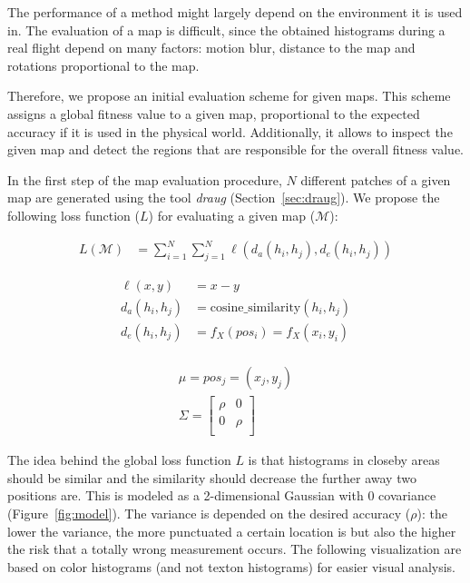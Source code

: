 The performance of a method might largely depend
on the environment it is used in. The evaluation of a map is
difficult, since the obtained histograms during a real flight depend
on many factors: motion blur, distance to the map and rotations
proportional to the map.

Therefore, we propose an initial evaluation scheme for given
maps. This scheme assigns a global fitness value to a given map,
proportional to the expected accuracy if it is used in the physical
world. Additionally, it allows to inspect the given map and detect the
regions that are responsible for the overall fitness value.

In the first step of the map evaluation procedure, $N$ different
patches of a given map are generated using the tool \emph{draug}
(Section~\ref{sec:draug}). We propose the following loss function
($L$) for evaluating a given map ($\mathcal{M}$):

\begin{align}
  L(\mathcal{M}) &= \sum_{i = 1}^{N} \sum_{j = 1}^{N} \ell(d_a(h_i, h_j), d_e(h_i, h_j))
\end{align}

\begin{align}
  \ell(x, y) &= x - y\\
  d_a(h_i, h_j) &= \text{cosine\_similarity}(h_i, h_j)\\
  d_e(h_i, h_j) &= f_X(pos_i) = f_X(x_i, y_i)\\
\end{align}

\begin{align}
\mu = pos_j = (x_j, y_j)\\
\Sigma =
  \begin{bmatrix}
    \rho & 0\\
    0 & \rho\\
  \end{bmatrix}
\end{align}

The idea behind the global loss function $L$ is that histograms in closeby areas
should be similar and the similarity should decrease the further away
two positions are. This is modeled as a 2-dimensional Gaussian with 0
covariance (Figure~\ref{fig:model}). The variance is depended on the
desired accuracy ($\rho$): the lower the variance, the more punctuated
a certain location is but also the higher the risk that a totally
wrong measurement occurs. The following visualization are based on
color histograms (and not texton histograms) for easier visual
analysis.

